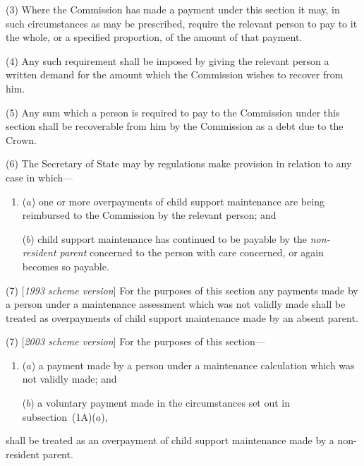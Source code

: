 \documentclass[12pt,a4paper]{article}
\begin{document}
(3) Where the 
Commission  %
has made a payment under this section 
it  %
may, in such circumstances as may be prescribed, require the relevant person to pay to 
it  %
the whole, or a specified proportion, of the amount of that payment.

(4) Any such requirement shall be imposed by giving the relevant person a written demand for the amount which the 
Commission  %
wishes to recover from him.

(5) Any sum which a person is required to pay to the 
Commission  %
under this section shall be recoverable from him by the 
Commission  %
as a debt due to the Crown.

(6) The Secretary of State may by regulations make provision in relation to any case in which—
\begin{enumerate}\item[]
($a$) one or more overpayments of child support maintenance are being reimbursed to the 
Commission  %
by the relevant person; and

($b$) child support maintenance has continued to be payable by the 
\emph{non-resident parent}  %
concerned to the person with care concerned, or again becomes so payable.
\end{enumerate}

(7) [\emph{1993 scheme version}] For the purposes of this section any payments made by a person under a maintenance assessment which was not validly made shall be treated as overpayments of child support maintenance made by an absent parent.

(7) [\emph{2003 scheme version}] For the purposes of this section—
\begin{enumerate}\item[]
($a$) a payment made by a person under a maintenance calculation which was not validly made; and

($b$) a voluntary payment made in the circumstances set out in subsection~(1A)($a$),
\end{enumerate}
shall be treated as an overpayment of child support maintenance made by a non-resident parent.
\end{document}
